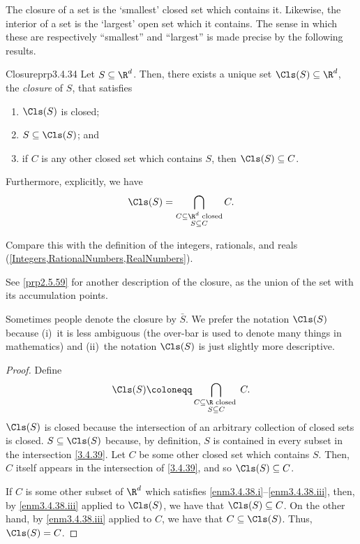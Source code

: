 The closure of a set is the `smallest' closed set which contains it.  Likewise, the interior of a set is the `largest' open set which it contains.  The sense in which these are respectively ``smallest'' and ``largest'' is made precise by the following results.
\begin{prp}{Closure}{prp3.4.34}
Let $S\subseteq \R ^d$.  Then, there exists a unique set $\Cls (S)\subseteq \R ^d$, the \emph{closure} of $S$, that satisfies
\begin{enumerate}
\item \label{enm3.4.38.i}$\Cls (S)$ is closed;
\item \label{enm3.4.38.ii}$S\subseteq \Cls (S)$; and
\item \label{enm3.4.38.iii}if $C$ is any other closed set which contains $S$, then $\Cls (S)\subseteq C$.
\end{enumerate}
Furthermore, explicitly, we have
\begin{equation}
\Cls (S)=\bigcap _{\substack{C\subseteq \R ^d\text{ closed} \\ S\subseteq C}}C.
\end{equation}
\begin{rmk}
Compare this with the definition of the integers, rationals, and reals (\cref{Integers,RationalNumbers,RealNumbers}).
\end{rmk}
\begin{rmk}
See \cref{prp2.5.59} for another description of the closure, as the union of the set with its accumulation points.
\end{rmk}
\begin{rmk}
Sometimes people denote the closure by $\bar{S}$.  We prefer the notation $\Cls (S)$ because (i)~it is less ambiguous (the over-bar is used to denote many things in mathematics) and (ii)~the notation $\Cls (S)$ is just slightly more descriptive.
\end{rmk}
\begin{proof}
Define
\begin{equation}\label{3.4.39}
\Cls (S)\coloneqq \bigcap _{\substack{C\subseteq \R \text{ closed } \\ S\subseteq C}}C.
\end{equation}
$\Cls (S)$ is closed because the intersection of an arbitrary collection of closed sets is closed.  $S\subseteq \Cls (S)$ because, by definition, $S$ is contained in every subset in the intersection \eqref{3.4.39}.  Let $C$ be some other closed set which contains $S$.  Then, $C$ itself appears in the intersection of \eqref{3.4.39}, and so $\Cls (S)\subseteq C$.

If $C$ is some other subset of $\R ^d$ which satisfies \cref{enm3.4.38.i}--\cref{enm3.4.38.iii}, then, by \cref{enm3.4.38.iii} applied to $\Cls (S)$, we have that $\Cls (S)\subseteq C$.  On the other hand, by \cref{enm3.4.38.iii} applied to $C$, we have that $C\subseteq \Cls (S)$.  Thus, $\Cls (S)=C$.
\end{proof}
\end{prp}
